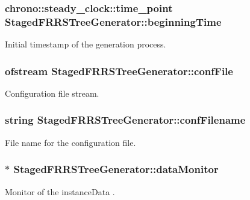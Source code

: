 \subsubsection[{\texorpdfstring{beginning\+Time}{beginningTime}}]{\setlength{\rightskip}{0pt plus 5cm}chrono\+::steady\+\_\+clock\+::time\+\_\+point Staged\+F\+R\+R\+S\+Tree\+Generator\+::beginning\+Time\hspace{0.3cm}{\ttfamily [protected]}}\hypertarget{class_staged_f_r_r_s_tree_generator_ae3f8c8407c40b6fac229574fcc8106d4}{}\label{class_staged_f_r_r_s_tree_generator_ae3f8c8407c40b6fac229574fcc8106d4}
Initial timestamp of the generation process. 
\subsubsection[{\texorpdfstring{conf\+File}{confFile}}]{\setlength{\rightskip}{0pt plus 5cm}ofstream Staged\+F\+R\+R\+S\+Tree\+Generator\+::conf\+File\hspace{0.3cm}{\ttfamily [protected]}}\hypertarget{class_staged_f_r_r_s_tree_generator_a764313586a157f7194ae945e76024e1f}{}\label{class_staged_f_r_r_s_tree_generator_a764313586a157f7194ae945e76024e1f}
Configuration file stream. 
\subsubsection[{\texorpdfstring{conf\+Filename}{confFilename}}]{\setlength{\rightskip}{0pt plus 5cm}string Staged\+F\+R\+R\+S\+Tree\+Generator\+::conf\+Filename\hspace{0.3cm}{\ttfamily [private]}}\hypertarget{class_staged_f_r_r_s_tree_generator_a051e558bc25271921834c40ff399a66b}{}\label{class_staged_f_r_r_s_tree_generator_a051e558bc25271921834c40ff399a66b}
File name for the configuration file. 
\subsubsection[{\texorpdfstring{data\+Monitor}{dataMonitor}}]{$\ast$ Staged\+F\+R\+R\+S\+Tree\+Generator\+::data\+Monitor\hspace{0.3cm}{\ttfamily [private]}}\hypertarget{class_staged_f_r_r_s_tree_generator_ad408787a8ec7350e68f00924ad6e8075}{}\label{class_staged_f_r_r_s_tree_generator_ad408787a8ec7350e68f00924ad6e8075}
Monitor of the {\ttfamily instance\+Data} . 
